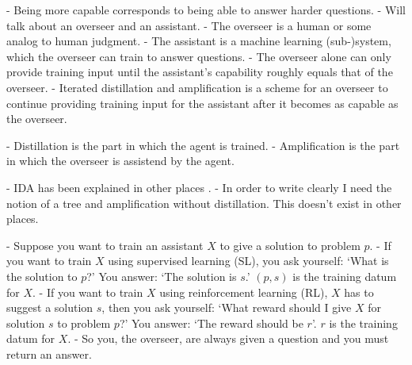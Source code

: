 \documentclass{farlamp}
\begin{document}
- Being more capable corresponds to being able to answer harder questions.
- Will talk about an overseer and an assistant.
- The overseer is a human or some analog to human judgment.
- The assistant is a machine learning (sub-)system, which the overseer can train to
answer questions.
- The overseer alone can only provide training input until the assistant's
capability roughly equals that of the overseer.
- Iterated distillation and amplification is a scheme for an overseer to
continue providing training input for the assistant after it becomes as capable as
the overseer.

- Distillation is the part in which the agent is trained.
- Amplification is the part in which the overseer is assistend by the agent.





- IDA has been explained in other places \parencite{CotrIDA, ESSMLPIDA}.
- In order to write clearly I need the notion of a tree and amplification
without distillation. This doesn't exist in other places.

- Suppose you want to train an assistant $X$ to give a solution to problem $p$.
- If you want to train $X$ using supervised learning (SL), you ask yourself:
‘What is the solution to $p$?’ You answer: ‘The solution is $s$.’ $(p, s)$
is the training datum for $X$.
- If you want to train $X$ using reinforcement learning (RL), $X$ has to suggest
a solution $s$, then you ask yourself: ‘What reward should I give $X$ for
solution $s$ to problem $p$?’ You answer: ‘The reward should be $r$’. $r$
is the training datum for $X$.
- So you, the overseer, are always given a question and you must return an
answer.
\end{document}
